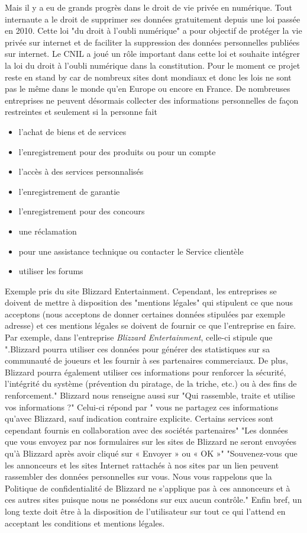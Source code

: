 \documentclass{article}
\begin{document}
Mais il y a eu de grands progrès dans le droit de vie privée en numérique.
Tout internaute a le droit de supprimer ses données gratuitement depuis une loi passée en 2010.
Cette loi "du droit à l'oubli numérique" a pour objectif de protéger la vie privée sur internet et de faciliter la suppression des données personnelles publiées sur internet.
Le CNIL a joué un rôle important dans cette loi et souhaite intégrer la loi du droit à l'oubli numérique dans la constitution.
Pour le moment ce projet reste en stand by car de nombreux sites dont mondiaux et donc les lois ne sont pas le même dans le monde qu'en Europe ou encore en France. 
De nombreuses entreprises ne peuvent désormais collecter des informations personnelles de façon restreintes et seulement si la personne fait
\begin{itemize}
    \item l’achat de biens et de services
    \item l’enregistrement pour des produits ou pour un compte
    \item l’accès à des services personnalisés
    \item l’enregistrement de garantie
    \item l’enregistrement pour des concours 
    \item une réclamation
    \item pour une assistance technique ou contacter le Service clientèle
    \item utiliser les forums
\end{itemize}
Exemple pris du site Blizzard Entertainment.
Cependant, les entreprises se doivent de mettre à disposition des "mentions légales" qui stipulent ce que nous acceptons (nous acceptons de donner certaines données stipulées par exemple adresse) et ces mentions légales se doivent de fournir ce que l'entreprise en faire.
Par exemple, dans l'entreprise \textit{Blizzard Entertainment}, celle-ci stipule que ".Blizzard pourra utiliser ces données pour générer des statistiques sur sa communauté de joueurs et les fournir à ses partenaires commerciaux. De plus, Blizzard pourra également utiliser ces informations pour renforcer la sécurité, l’intégrité du système (prévention du piratage, de la triche, etc.) ou à des fins de renforcement."
Blizzard nous renseigne aussi sur "Qui rassemble, traite et utilise vos informations ?"
Celui-ci répond par "  vous ne partagez ces informations qu’avec Blizzard, sauf indication contraire explicite. Certains services sont cependant fournis en collaboration avec des sociétés partenaires"
"Les données que vous envoyez par nos formulaires sur les sites de Blizzard ne seront envoyées qu’à Blizzard après avoir cliqué sur « Envoyer » ou « OK »"
"Souvenez-vous que les annonceurs et les sites Internet rattachés à nos sites par un lien peuvent rassembler des données personnelles sur vous. Nous vous rappelons que la Politique de confidentialité de Blizzard ne s’applique pas à ces annonceurs et à ces autres sites puisque nous ne possédons sur eux aucun contrôle."
Enfin bref, un long texte doit être à la disposition de l'utilisateur sur tout ce qui l'attend en acceptant les conditions et mentions légales.
\end{document}
